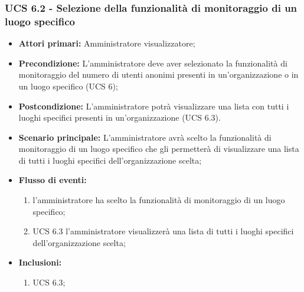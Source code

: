 \subsubsection{UCS 6.2 - Selezione della funzionalità di monitoraggio di un luogo specifico}
\begin{itemize}
	\item \textbf{Attori primari:} Amministratore visualizzatore;
	\item \textbf{Precondizione:} L'amministratore deve aver selezionato la funzionalità di monitoraggio del numero di utenti anonimi presenti in un'organizzazione o in un luogo specifico (UCS 6);
	\item \textbf{Postcondizione:} L'amministratore potrà visualizzare una lista con tutti i luoghi specifici presenti in un'organizzazione (UCS 6.3).
	\item \textbf{Scenario principale:} L'amministratore avrà scelto la funzionalità di monitoraggio di un luogo specifico che gli permetterà di visualizzare una lista di tutti i luoghi specifici dell'organizzazione scelta;
	\item \textbf{Flusso di eventi:} 
	\begin{enumerate}
		\item l'amministratore ha scelto la funzionalità di monitoraggio di un luogo specifico;
		\item UCS 6.3 l'amministratore visualizzerà una lista di tutti i luoghi specifici dell'organizzazione scelta;
	\end{enumerate}
	\item \textbf{Inclusioni:}
	\begin{enumerate}
		\item UCS 6.3;
	\end{enumerate}
\end{itemize}


